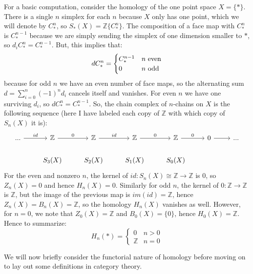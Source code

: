 \documentclass[11pt, oneside]{amsart}   	%
\theoremstyle{definition}
\begin{document}
For a basic computation, consider the homology of the one point space $X = \{*\}$. There is a single $n$ simplex for each 
$n$ because $X$ only has one point, which we will denote by $C_*^n$, so $S_*(X) = \mathbb Z\{C_*^n\}$. The composition 
of a face map with $C_*^n$ is $C_*^{n - 1}$ because we are simply sending the simplex of one dimension smaller to $*$, 
so $d_i C_*^n = C_*^{n - 1}$. But, this implies that:
\begin{equation}
	d C_*^n = \begin{cases}
		C_*^{n - 1} & n\textnormal{ even} \\
		0 & n\textnormal{ odd} \\
	\end{cases}
\end{equation}
because for odd $n$ we have an even number of face maps, so the alternating sum $d = \sum_{i = 0}^n (-1)^n d_i$ cancels 
itself and vanishes. For even $n$ we have one surviving $d_i$, so $d C_*^n = C_*^{n - 1}$. So, the chain complex of 
$n$-chains on $X$ is the following sequence (here I have labeled each copy of $\mathbb Z$ with which copy of $S_n(X)$ 
it is):
\begin{equation}\begin{tikzcd}
		...\arrow[r, "id"] & \mathbb Z\arrow[r, "0"] & \mathbb Z\arrow[r, "id"] & \mathbb Z\arrow[r, "0"]
		& \mathbb Z\arrow[r, "0"] & 0\arrow[r] & ... \\
		 & S_3(X) & S_2(X) & S_1(X) & S_0(X) &
\end{tikzcd}\end{equation}
For the even and nonzero $n$, the kernel of $id : S_n(X)\cong\mathbb Z\rightarrow \mathbb Z$ is 0, so $Z_n(X) = 0$ and 
hence $H_n(X) = 0$. Similarly for odd $n$, the kernel of $0 : \mathbb Z\rightarrow\mathbb Z$ is $\mathbb Z$, but the image 
of the previous map is $im(id) = \mathbb Z$, hence $Z_n(X) = B_n(X) = \mathbb Z$, so the homology $H_n(X)$ vanishes as 
well. However, for $n = 0$, we note that $Z_0(X) = \mathbb Z$ and $B_0(X) = \{0\}$, hence $H_0(X) = \mathbb Z$. 
Hence to summarize:
\begin{equation}
	H_n(*) = \begin{cases}
	0 & n > 0 \\
	\mathbb Z & n = 0
	\end{cases}
\end{equation}

We will now briefly consider the functorial nature of homology before 
moving on to lay out some definitions in category theory. 
\end{document}
